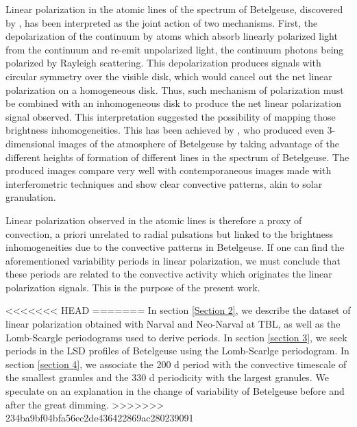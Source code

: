 \documentclass{aa}
\begin{document}
Linear polarization in the atomic lines of the spectrum of Betelgeuse, discovered by \cite{auriere_discovery_2016}, has been interpreted as the joint action of 
two mechanisms. First, the depolarization of the continuum by atoms which absorb linearly polarized light from the continuum and re-emit unpolarized light,
the continuum photons being polarized by Rayleigh scattering. This depolarization produces signals with circular symmetry over the visible disk, which would  cancel out the net linear polarization on a homogeneous disk. Thus, such mechanism of polarization must be combined with an inhomogeneous disk to produce the net linear polarization 
signal observed. This interpretation suggested the possibility of mapping those brightness inhomogeneities. This has been achieved by \cite{lopez_ariste_convective_2018}, who produced even 3-dimensional images of the atmosphere of Betelgeuse \citep{lopez_ariste_three-dimensional_2022} by taking advantage of the different heights of formation of 
different lines in the spectrum of Betelgeuse. The produced images compare very well with contemporaneous images made with interferometric 
techniques \citep{montarges_close_2016} and show clear convective patterns, akin to solar granulation.\

Linear polarization observed in the atomic lines is therefore a proxy of convection, a priori unrelated to radial 
pulsations but linked to the brightness inhomogeneities due to the convective patterns in Betelgeuse. If one can find the aforementioned variability periods 
in linear polarization, we must conclude that these periods are related to the convective activity which originates the linear polarization signals.
This is the purpose of the present work.\

<<<<<<< HEAD
=======
In section \ref{Section 2}, we describe the dataset of linear polarization obtained with Narval and Neo-Narval at TBL, as well as the Lomb-Scargle periodograms used to derive periods. In section \ref{section 3}, we seek periods in the LSD profiles of Betelgeuse using the Lomb-Scarlge periodogram. In section \ref{section 4}, we associate the 200 d period with the convective timescale of the smallest granules and the 330 d periodicity with the largest granules. We speculate on an explanation in the change of variability of Betelgeuse before and after the great dimming. 
>>>>>>> 234ba9bf04bfa56ec2de436422869ac280239091
\end{document}
